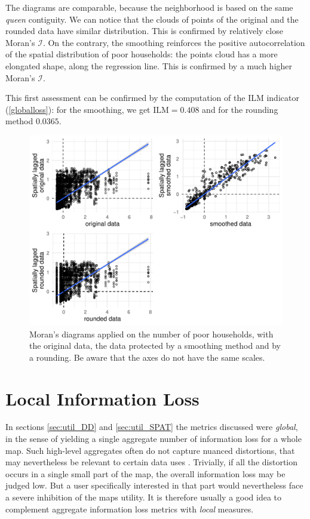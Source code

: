 The diagrams are comparable, because the neighborhood is based on the same \textit{queen} contiguity. We can notice that the clouds of points of the original and the rounded data have similar distribution. This is confirmed by relatively close Moran's $\mathcal{I}$. On the contrary, the smoothing reinforces the positive autocorrelation of the spatial distribution of poor households: the points cloud has a more elongated shape, along the regression line. This is confirmed by a much higher Moran's $\mathcal{I}$.

This first assessment can be confirmed by the computation of the $\mathrm{ILM}$ indicator (\ref{globalloss}): for the smoothing, we get $\mathrm{ILM} = 0.408$ and for the rounding method $0.0365$.

\begin{figure}
    \centering
    \includegraphics[width=0.8\linewidth]{figures/moran_plot.pdf}
    \caption{Moran's diagrams applied on the number of poor households, with the original data, the data protected by a smoothing method and by a rounding. Be aware that the axes do not have the same scales.}
    \label{fig:moran_plot}
\end{figure}

\section{Local Information Loss} \label{sec:util_LOC}

In sections \ref{sec:util_DD} and \ref{sec:util_SPAT} the metrics discussed were \emph{global}, in the sense of yielding a single aggregate number of information loss for a whole map. Such high-level aggregates often do not capture nuanced distortions, that may nevertheless be relevant to certain data uses \citep{CoxEtAl2011, WooEtAl2009}.
Trivially, if all the distortion occurs in a single small part of the map, the overall information loss may be judged low. But a user specifically interested in that part would nevertheless face a severe inhibition of the maps utility. It is therefore usually a good idea to complement aggregate information loss metrics with \emph{local} measures.

